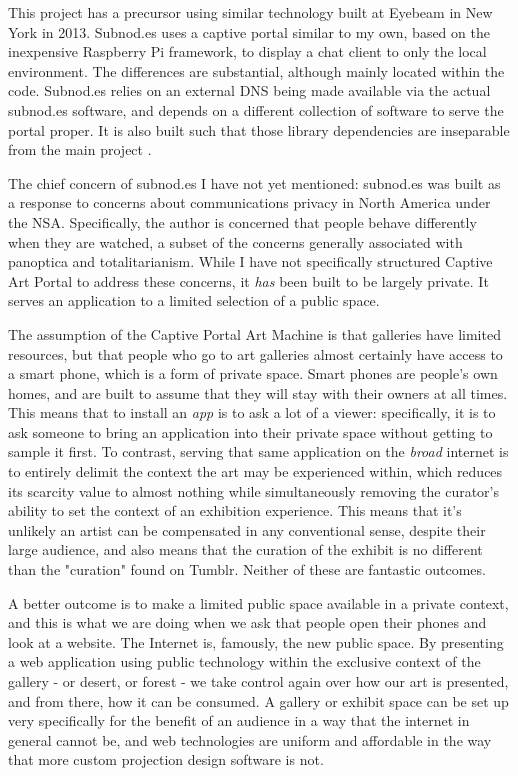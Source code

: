 This project has a precursor using similar technology built at Eyebeam in New York in 2013. Subnod.es uses a captive portal similar to my own, based on the inexpensive Raspberry Pi framework, to display a chat client to only the local environment. The differences are substantial, although mainly located within the code. Subnod.es relies on an external DNS being made available via the actual subnod.es software, and depends on a different collection of software to serve the portal proper. It is also built such that those library dependencies are inseparable from the main project \cite{subnodes}. 

The chief concern of subnod.es I have not yet mentioned: subnod.es was built as a response to concerns about communications privacy in North America under the NSA. Specifically, the author is concerned that people behave differently when they are watched, a subset of the concerns generally associated with panoptica and totalitarianism. While I have not specifically structured Captive Art Portal to address these concerns, it \textit{has} been built to be largely private. It serves an application to a limited selection of a public space. 

The assumption of the Captive Portal Art Machine is that galleries have limited resources, but that people who go to art galleries almost certainly have access to a smart phone, which is a form of private space. Smart phones are people's own homes, and are built to assume that they will stay with their owners at all times. This means that to install an \textit{app} is to ask a lot of a viewer: specifically, it is to ask someone to bring an application into their private space without getting to sample it first. To contrast, serving that same application on the \textit{broad} internet is to entirely delimit the context the art may be experienced within, which reduces its scarcity value to almost nothing while simultaneously removing the curator's ability to set the context of an exhibition experience. This means that it's unlikely an artist can be compensated in any conventional sense, despite their large audience, and also means that the curation of the exhibit is no different than the "curation" found on Tumblr. Neither of these are fantastic outcomes.

A better outcome is to make a limited public space available in a private context, and this is what we are doing when we ask that people open their phones and look at a website. The Internet is, famously, the new public space. By presenting a web application using public technology within the exclusive context of the gallery - or desert, or forest - we take control again over how our art is presented, and from there, how it can be consumed. A gallery or exhibit space can be set up very specifically for the benefit of an audience in a way that the internet in general cannot be, and web technologies are uniform and affordable in the way that more custom projection design software is not.

